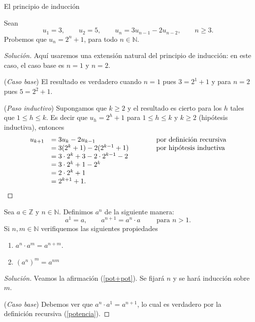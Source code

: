 \begin{section}{El principio de inducción}
\begin{ejemplo*}
Sean $$u_1 = 3,\qquad u_2 = 5,\qquad u_n = 3u_{n-1}- 2u_{n-2},\qquad  n \ge 3.$$
Probemos que $u_n = 2^n + 1$, para todo $n \in  \mathbb N$.
\begin{proof}[Solución] Aquí usaremos una extensión natural del principio de inducción: en este caso, el caso base es $n=1$ y $n=2$.

\noindent(\textit{Caso  base}) El resultado es verdadero cuando $n= 1$ pues $3 = 2^1+1$ y para $n=2$ pues $ 5 =2^2+1$.

\noindent (\textit{Paso  inductivo}) Supongamos que $k \ge 2$ y el resultado  es cierto para los $h$ tales que  $1 \le h \le k$. Es decir que $u_h = 2^h+1$ para $1 \le h \le k$ y $k \ge 2$ (hipótesis inductiva), entonces
$$
\begin{matrix} u_{k+1} &= 3u_k -2u_{k-1} \hfill &\qquad &\text{por definición recursiva} \hfill \\
&= 3(2^k+1)-2(2^{k-1}+1) \hfill &\qquad &\text{por hipótesis inductiva}\hfill \\
&= 3\cdot 2^k+3-2\cdot 2^{k-1}-2 \hfill &\qquad & \\
&= 3\cdot 2^k+1- 2^{k} \hfill &\qquad & \\
&= 2\cdot 2^k+1 \hfill &\qquad & \\
&= 2^{k+1}+1. \hfill &\qquad & 
\end{matrix}
$$
\end{proof}
\end{ejemplo*}


\begin{ejemplo*}
Sea $a \in \mathbb Z$ y $n \in \mathbb N$. Definimos $a^n$ de la siguiente manera:
\begin{equation}\label{potencia}
a^1 = a, \qquad a^{n+1} = a^{n}\cdot a \qquad \text{ para $n >1$.}
\end{equation}
Si $n,m \in \mathbb N$ verifiquemos las siguientes propiedades

\begin{enumerate}[label=(\alph*)]
\item \label{pot+pot} $a^{n} \cdot a^m = a^{n+m}$.
\item \label{potpot} $(a^n)^m = a^{nm}$
\end{enumerate}
\end{ejemplo*}
\begin{proof}[Solución] 
    Veamos la afirmación (\ref{pot+pot}). Se fijará $n$ y se hará inducción sobre $m$. 
    
    \noindent(\textit{Caso  base}) Debemos ver que $a^{n} \cdot a^1 = a^{n+1}$, lo cual es verdadero por la definición recursiva (\ref{potencia}). 
    

\end{proof}
\end{section}
